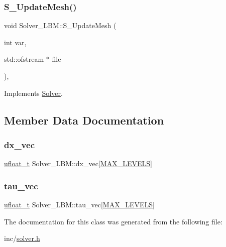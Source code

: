 \mbox{\label{classSolver__LBM_a59e8d7c94e3895a3586972bdbf0ebb77}} 
\subsubsection{\texorpdfstring{S\+\_\+\+Update\+Mesh()}{S\_UpdateMesh()}}
{\footnotesize\ttfamily void Solver\+\_\+\+L\+B\+M\+::\+S\+\_\+\+Update\+Mesh (\begin{DoxyParamCaption}\item[{int}]{var,  }\item[{std\+::ofstream $\ast$}]{file }\end{DoxyParamCaption})\hspace{0.3cm}{\ttfamily [inline]}, {\ttfamily [virtual]}}



Implements \hyperlink{classSolver_a8c73af137ee8c7ab25d8195448088a7b}{Solver}.



\subsection{Member Data Documentation}
\mbox{\label{classSolver__LBM_a1ece0e58740be29fcaea526f7da7fe4a}} 
\subsubsection{\texorpdfstring{dx\+\_\+vec}{dx\_vec}}
{\footnotesize\ttfamily \hyperlink{cppspec_8h_af529d360dfac9b9578aa719418a53a21}{ufloat\+\_\+t} Solver\+\_\+\+L\+B\+M\+::dx\+\_\+vec\mbox{[}\hyperlink{cppspec_8h_add784659439a8dd6b1423406171414d3}{M\+A\+X\+\_\+\+L\+E\+V\+E\+LS}\mbox{]}\hspace{0.3cm}{\ttfamily [private]}}

\mbox{\label{classSolver__LBM_ad5b36057b2d1db724ff10f4dd6b59105}} 
\subsubsection{\texorpdfstring{tau\+\_\+vec}{tau\_vec}}
{\footnotesize\ttfamily \hyperlink{cppspec_8h_af529d360dfac9b9578aa719418a53a21}{ufloat\+\_\+t} Solver\+\_\+\+L\+B\+M\+::tau\+\_\+vec\mbox{[}\hyperlink{cppspec_8h_add784659439a8dd6b1423406171414d3}{M\+A\+X\+\_\+\+L\+E\+V\+E\+LS}\mbox{]}\hspace{0.3cm}{\ttfamily [private]}}



The documentation for this class was generated from the following file\+:\begin{DoxyCompactItemize}
\item 
inc/\hyperlink{solver_8h}{solver.\+h}\end{DoxyCompactItemize}
